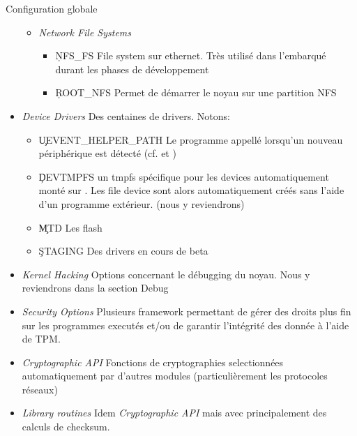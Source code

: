 \begin{frame}[fragile=singleslide]{Configuration globale}
\begin{itemize}
\begin{itemize}
    \item \emph{Network File Systems}
      \begin{itemize}
      \item \c{NFS_FS}  File system  sur ethernet.  Très  utilisé dans
        l'embarqué durant les phases de développement
      \item \c{ROOT_NFS} Permet de démarrer le noyau sur une partition
        NFS
      \end{itemize} 
    \end{itemize} 
  \item \emph{Device Drivers} Des centaines de drivers. Notons:
    \begin{itemize}
    \item   \c{UEVENT_HELPER_PATH}  Le  programme   appellé  lorsqu'un
      nouveau            périphérique            est           détecté
      (cf.                           et
      )
    \item   \c{DEVTMPFS}  un   tmpfs  spécifique   pour   les  devices
      automatiquement  monté sur  .  Les  file  device sont
      alors   automatiquement  créés   sans   l'aide  d'un   programme
      extérieur. (nous y reviendrons)
    \item \c{MTD} Les flash
    \item \c{STAGING} Des drivers en cours de beta 
    \end{itemize} 
  \item  \emph{Kernel  Hacking}  Options  concernant le  débugging  du
    noyau. Nous y reviendrons dans la section Debug
  \item  \emph{Security  Options}  Plusieurs framework  permettant  de
    gérer des  droits plus  fin sur les  programmes executés  et/ou de
    garantir l'intégrité des donnée à l'aide de TPM.
  \item   \emph{Cryptographic   API}   Fonctions   de   cryptographies
    selectionnées     automatiquement     par     d'autres     modules
    (particulièrement les protocoles réseaux)
  \item  \emph{Library routines}  Idem  \emph{Cryptographic API}  mais
    avec principalement des calculs de checksum.
  \end{itemize} 
\end{frame}



